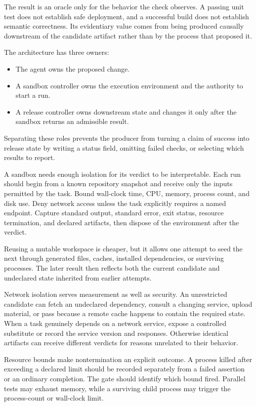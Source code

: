 The result is an oracle only for the behavior the check observes. A passing unit test does not establish safe deployment, and a successful build does not establish semantic correctness. Its evidentiary value comes from being produced causally downstream of the candidate artifact rather than by the process that proposed it.

The architecture has three owners:

\begin{itemize}
\tightlist
\item
  The agent owns the proposed change.
\item
  A sandbox controller owns the execution environment and the authority to start a run.
\item
  A release controller owns downstream state and changes it only after the sandbox returns an admissible result.
\end{itemize}

Separating these roles prevents the producer from turning a claim of success into release state by writing a status field, omitting failed checks, or selecting which results to report.

A sandbox needs enough isolation for its verdict to be interpretable. Each run should begin from a known repository snapshot and receive only the inputs permitted by the task. Bound wall-clock time, CPU, memory, process count, and disk use. Deny network access unless the task explicitly requires a named endpoint. Capture standard output, standard error, exit status, resource termination, and declared artifacts, then dispose of the environment after the verdict.

Reusing a mutable workspace is cheaper, but it allows one attempt to seed the next through generated files, caches, installed dependencies, or surviving processes. The later result then reflects both the current candidate and undeclared state inherited from earlier attempts.

Network isolation serves measurement as well as security. An unrestricted candidate can fetch an undeclared dependency, consult a changing service, upload material, or pass because a remote cache happens to contain the required state. When a task genuinely depends on a network service, expose a controlled substitute or record the service version and responses. Otherwise identical artifacts can receive different verdicts for reasons unrelated to their behavior.

Resource bounds make nontermination an explicit outcome. A process killed after exceeding a declared limit should be recorded separately from a failed assertion or an ordinary completion. The gate should identify which bound fired. Parallel tests may exhaust memory, while a surviving child process may trigger the process-count or wall-clock limit.

